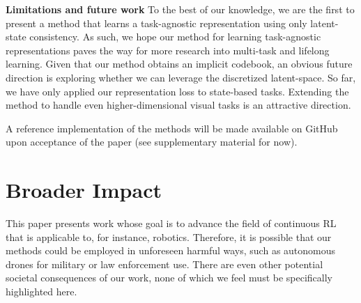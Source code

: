 \documentclass{article}
\makeatletter
\theoremstyle{plain}
\theoremstyle{definition}
\theoremstyle{remark}
\newcommand{\our}{\textsc{iQRL}\xspace}
\newcommand{\eg}{\textit{e.g.\@}\xspace}
\makeatother
\begin{document}
\textbf{Limitations and future work}
To the best of our knowledge, we are the first to present a method that learns a task-agnostic representation
using only latent-state consistency. As such, we hope our method for learning task-agnostic representations paves the
way for more research into multi-task and lifelong learning.
Given that our method obtains an implicit codebook, an obvious future direction is exploring whether we can leverage the
discretized latent-space. So far, we have only applied our representation loss to state-based tasks. Extending the method to handle even higher-dimensional visual tasks is an attractive direction.


A reference implementation of the methods will be made available on GitHub upon acceptance of the paper (see supplementary material for now).



\section*{Broader Impact}
This paper presents work whose goal is to advance the field of continuous RL that is applicable to, for instance, robotics. Therefore, it is possible that our methods could be employed in unforeseen harmful ways, such as autonomous drones for military or law enforcement use. There are even other potential societal consequences of our work, none of which we feel must be specifically highlighted here.
\end{document}
